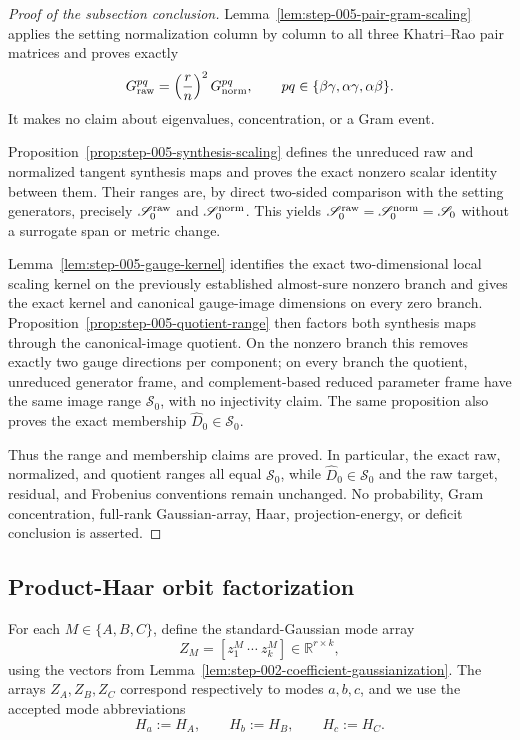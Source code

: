 \begin{proof}[Proof of the subsection conclusion]

Lemma~\ref{lem:step-005-pair-gram-scaling} applies the setting normalization
column by column to all three Khatri--Rao pair matrices and proves exactly
\[
  G_{\rm raw}^{pq}=\left(\frac rn\right)^2G_{\rm norm}^{pq},
  \qquad pq\in\{\beta\gamma,\alpha\gamma,\alpha\beta\}.
\]
It makes no claim about eigenvalues, concentration, or a Gram event.

Proposition~\ref{prop:step-005-synthesis-scaling} defines the unreduced raw
and normalized tangent synthesis maps and proves the exact nonzero scalar
identity between them. Their ranges are, by direct two-sided comparison with
the setting generators, precisely \(\mathscr S_0^{\rm raw}\) and
\(\mathscr S_0^{\rm norm}\). This yields
\(\mathscr S_0^{\rm raw}=\mathscr S_0^{\rm norm}=\mathscr S_0\) without a
surrogate span or metric change.

Lemma~\ref{lem:step-005-gauge-kernel} identifies the exact two-dimensional
local scaling kernel on the previously established almost-sure nonzero branch and
gives the exact kernel and canonical gauge-image dimensions on every zero
branch.
Proposition~\ref{prop:step-005-quotient-range} then factors both synthesis
maps through the canonical-image quotient. On the nonzero branch this removes
exactly two gauge directions per component; on every branch the quotient,
unreduced generator frame, and complement-based reduced parameter frame have
the same image range \(\mathscr S_0\), with no injectivity claim. The same
proposition also proves the exact membership
\(\widehat D_0\in\mathscr S_0\).

Thus the range and membership claims are proved. In particular, the exact raw,
normalized, and quotient ranges all equal \(\mathscr S_0\), while
\(\widehat D_0\in\mathscr S_0\) and the raw target, residual, and Frobenius
conventions remain unchanged. No probability, Gram concentration,
full-rank Gaussian-array, Haar, projection-energy, or deficit conclusion is
asserted.

\end{proof}

\subsection{Product-Haar orbit factorization}\label{app:step-006}

For each \(M\in\{A,B,C\}\), define the standard-Gaussian mode array
\[
  Z_M=[z_1^M\ \cdots\ z_k^M]\in\mathbb R^{r\times k},
\]
using the vectors from
Lemma~\ref{lem:step-002-coefficient-gaussianization}.  The arrays
\(Z_A,Z_B,Z_C\) correspond respectively to modes \(a,b,c\), and we use the
accepted mode abbreviations
\[
  H_a:=H_A,\qquad H_b:=H_B,\qquad H_c:=H_C.
\]

